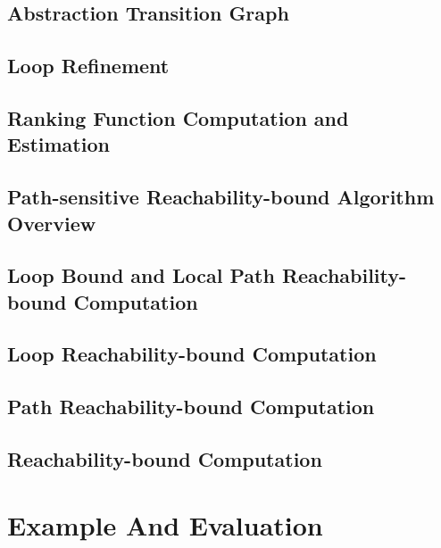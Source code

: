 \documentclass[12pt, letterpaper]{report}   %
\begin{document}
\section{Abstraction Transition Graph}
\label{sec:psRB-progabs}


\section{Loop Refinement}
\label{sec:psRB-refine}


\section{Ranking Function Computation and Estimation}
\label{sec:psRB-rank}


\section{Path-sensitive Reachability-bound Algorithm Overview}
\label{sec:psRB-psrb}


\section{Loop Bound and Local Path Reachability-bound Computation}
\label{sec:psRB-pathlocalrb}


\section{Loop Reachability-bound Computation}
\label{sec:psRB-looprb}


\section{Path Reachability-bound Computation}
\label{sec:psRB-pathrb}


\section{Reachability-bound Computation}
\label{sec:psRB-rb}


\chapter{Example And Evaluation}
\label{sec:psRB-eval}
\end{document}
